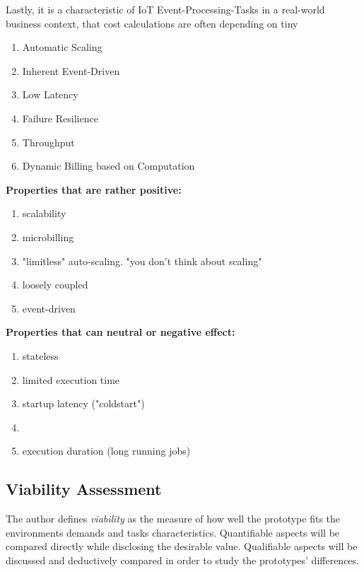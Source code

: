 Lastly, it is a characteristic of IoT Event-Processing-Tasks in a real-world business context, that cost calculations are often depending on tiny 


\begin{enumerate}
    \item Automatic Scaling
    \item Inherent Event-Driven
    \item Low Latency
    \item Failure Resilience
    \item Throughput
    \item Dynamic Billing based on Computation
\end{enumerate}

\textbf{Properties that are rather positive:}
\begin{enumerate}\label{lst:suitPro}
    \item scalability
    \item microbilling
    \item "limitless" auto-scaling. "you don't think about scaling"
    \item loosely coupled
    \item event-driven
\end{enumerate}

\textbf{Properties that can neutral or negative effect:}
\begin{enumerate}\label{lst:suitCon}
    \item stateless 
    \item limited execution time
    \item startup latency ("coldstart")
    \item 
    \item execution duration (long running jobs)
\end{enumerate}

\subsection{Viability Assessment}

The author defines \textit{viability} as the measure of how well the prototype fits the environments demands and tasks characteristics. Quantifiable aspects will be compared directly while disclosing the desirable value. Qualifiable aspects will be discussed and deductively compared in order to study the prototypes' differences. 

